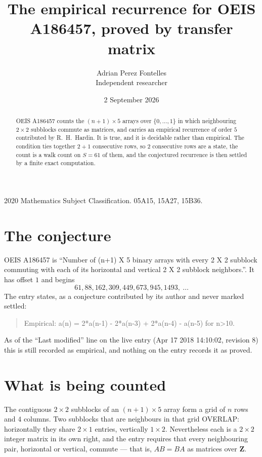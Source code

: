 \documentclass[11pt,a4paper]{article}
\title{The empirical recurrence for OEIS A186457, proved by transfer matrix}
\author{Adrian Perez Fontelles\\ \small Independent researcher}
\date{2 September 2026}
\theoremstyle{plain}
\theoremstyle{definition}
\begin{document}
\maketitle

\begin{abstract}
OEIS A186457 counts the $(n+1)\times5$ arrays over $\{0,\dots,1\}$ in which
neighbouring $2\times2$ subblocks commute as matrices, and carries an empirical recurrence
of order $5$ contributed by R.~H.~Hardin. It is true, and it is decidable rather than
empirical. The condition ties together $2+1$ consecutive rows, so $2$ consecutive rows are
a state, the count is a walk count on $S=61$ of them, and the conjectured recurrence is then
settled by a finite exact computation.
\end{abstract}

\noindent\small 2020 Mathematics Subject Classification. 05A15, 15A27, 15B36.\normalsize

\section{The conjecture}

OEIS A186457 is ``Number of (n+1) X 5 binary arrays with every 2 X 2 subblock commuting with each of its horizontal and vertical 2 X 2 subblock neighbors.''. It has offset $1$ and begins
\[
61, 88, 162, 309, 449, 673, 945, 1493,\ \dots
\]
The entry states, as a conjecture contributed by its author and never marked settled:
\begin{quote}
Empirical: a(n) = 2*a(n-1) - 2*a(n-3) + 2*a(n-4) - a(n-5) for n>10.
\end{quote}
As of the ``Last modified'' line on the live entry (Apr 17 2018 14:10:02, revision 8) this is still
recorded as empirical, and nothing on the entry records it as proved.

\section{What is being counted}

The contiguous $2\times2$ subblocks of an $(n+1)\times5$ array form a grid of $n$
rows and $4$ columns. Two subblocks that are neighbours in that
grid OVERLAP: horizontally they share $2\times1$ entries, vertically
$1\times2$. Nevertheless each is a $2\times2$ integer matrix in its own right, and
the entry requires that every neighbouring pair, horizontal or vertical, commute --- that is,
$AB=BA$ as matrices over $\mathbf{Z}$.
\end{document}
